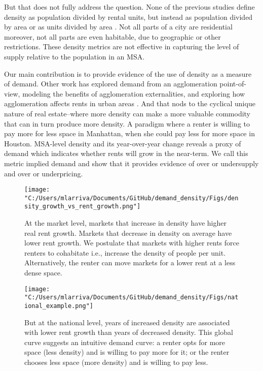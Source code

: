 \documentclass[sn-mathphys-num]{sn-jnl}%
\theoremstyle{thmstyleone}%
\theoremstyle{thmstyletwo}%
\theoremstyle{thmstylethree}%
\begin{document}
But that does not fully address the question. None of the previous studies define density as population divided by rental units, but instead as population divided by area or as units divided by area . Not all parts of a city are residential moreover, not all parts are even habitable, due to geographic or other restrictions. These density metrics are not effective in capturing the level of supply relative to the population in an MSA.  

Our main contribution is to provide evidence of the use of density as a measure of demand. Other work has explored demand from an agglomeration point-of-view, modeling the benefits of agglomeration externalities, and exploring how agglomeration affects rents in urban areas \cite{titman2024city} \cite{liu2018vertical}. And that nods to the cyclical unique nature of real estate--where more density can make a more valuable commodity that can in turn produce more density. A paradigm where a renter is willing to pay more for less space in Manhattan, when she could pay less for more space in Houston. MSA-level density and its year-over-year change reveals a proxy of demand which indicates whether rents will grow in the near-term. We call this metric implied demand and show that it provides evidence of over or undersupply and over or underpricing.  

\begin{figure}[H]
	\centering
	\texttt{[image: "C:/Users/mlarriva/Documents/GitHub/demand\_density/Figs/density\_growth\_vs\_rent\_growth.png"]}
	\caption{At the market level, markets that increase in density have higher real rent growth. Markets that decrease in density on average have lower rent growth. We postulate that markets with higher rents force renters to cohabitate i.e., increase the density of people per unit. Alternatively, the renter can move markets for a lower rent at a less dense space.}\label{fig1}
\end{figure}

\begin{figure}[H]
	\centering
	\texttt{[image: "C:/Users/mlarriva/Documents/GitHub/demand\_density/Figs/national\_example.png"]}
	\caption{But at the national level, years of increased density are associated with lower rent growth than years of decreased density. This global curve suggests an intuitive demand curve: a renter opts for more space (less density) and is willing to pay more for it; or the renter chooses less space (more density) and is willing to pay less.}\label{fig4}
\end{figure}
\end{document}
